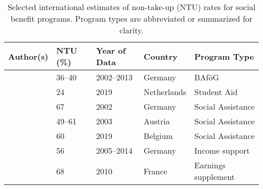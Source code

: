\begin{table}[htbp]
\renewcommand{\arraystretch}{1.3}
\footnotesize
\centering
\begin{tabularx}{\textwidth}{@{}l l l l X@{}}
\toprule
\textbf{Author(s)} & \textbf{NTU (\%)} & \textbf{Year of Data} & \textbf{Country} & \textbf{Program Type} \\
\midrule
\cite{herber_non-take-up_2019}    & 36--40   & 2002--2013 & Germany     & BAföG \\
\cite{konijn_quantifying_2023}    & 24       & 2019       & Netherlands & Student Aid \\
\cite{frick_claim_2007}            & 67       & 2002       & Germany     & Social Assistance \\
\cite{fuchs_austria_2007}          & 49--61   & 2003       & Austria     & Social Assistance \\
\cite{goedeme_take_2022}           & 60       & 2019       & Belgium     & Social Assistance \\
\cite{harnisch_nontakeup_2019}    & 56       & 2005--2014 & Germany     & Income support \\
\cite{domingo_nonrecours_2014}     & 68       & 2010       & France      & Earnings supplement \\
\bottomrule
\end{tabularx}
\caption{\small{Selected international estimates of non-take-up (NTU) rates for social benefit programs. Program types are abbreviated or summarized for clarity.}}
\label{table:NTU-studies}
\end{table}
